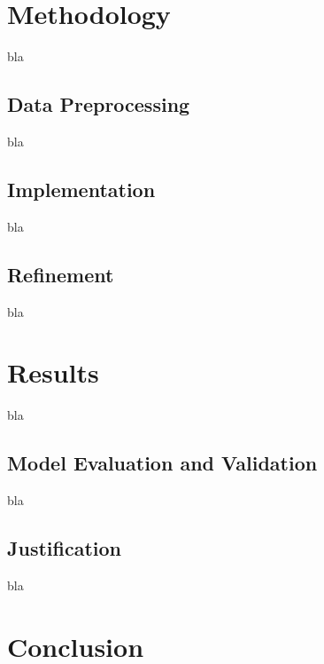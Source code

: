 \documentclass[a4paper]{article}
\begin{document}

\section{Methodology}
\label{sec:methodology}

bla

\subsection{Data Preprocessing}
bla

\subsection{Implementation}
bla

\subsection{Refinement}
bla


\section{Results}
\label{sec:results}

bla

\subsection{Model Evaluation and Validation}
bla

\subsection{Justification}
bla


\section{Conclusion}
\label{sec:conclusion}
\end{document}

